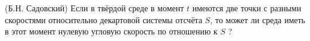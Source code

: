 (Б.Н. Садовский)
Если в твёрдой среде в момент $t$ имеются две точки с разными скоростями
относительно декартовой системы отсчёта $S$, то может ли среда иметь в
этот момент нулевую угловую скорость по отношению к $S$ ?

